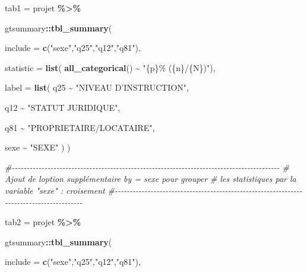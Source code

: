 \documentclass[
]{article}
\newenvironment{Shaded}{\begin{snugshade}}{\end{snugshade}}
\newcommand{\AttributeTok}[1]{\textcolor[rgb]{0.13,0.29,0.53}{#1}}
\newcommand{\CommentTok}[1]{\textcolor[rgb]{0.56,0.35,0.01}{\textit{#1}}}
\newcommand{\FunctionTok}[1]{\textcolor[rgb]{0.13,0.29,0.53}{\textbf{#1}}}
\newcommand{\NormalTok}[1]{#1}
\newcommand{\OtherTok}[1]{\textcolor[rgb]{0.56,0.35,0.01}{#1}}
\newcommand{\SpecialCharTok}[1]{\textcolor[rgb]{0.81,0.36,0.00}{\textbf{#1}}}
\newcommand{\StringTok}[1]{\textcolor[rgb]{0.31,0.60,0.02}{#1}}
\begin{document}
\begin{Shaded}
\begin{Highlighting}[]
\NormalTok{tab1 }\OtherTok{=}\NormalTok{ projet }\SpecialCharTok{\%\textgreater{}\%}
  
  
\NormalTok{  gtsummary}\SpecialCharTok{::}\FunctionTok{tbl\_summary}\NormalTok{(}
    
    \AttributeTok{include =} \FunctionTok{c}\NormalTok{(}\StringTok{"sexe"}\NormalTok{,}\StringTok{"q25"}\NormalTok{,}\StringTok{"q12"}\NormalTok{,}\StringTok{"q81"}\NormalTok{),}
    
    \AttributeTok{statistic =}  \FunctionTok{list}\NormalTok{( }\FunctionTok{all\_categorical}\NormalTok{() }\SpecialCharTok{\textasciitilde{}} \StringTok{"\{p\}\% (\{n\}/\{N\})"}\NormalTok{),}
    
    \AttributeTok{label =} \FunctionTok{list}\NormalTok{( q25 }\SpecialCharTok{\textasciitilde{}} \StringTok{"NIVEAU D’INSTRUCTION"}\NormalTok{,}
                  
\NormalTok{                  q12 }\SpecialCharTok{\textasciitilde{}} \StringTok{"STATUT JURIDIQUE"}\NormalTok{,}
                  
\NormalTok{                  q81 }\SpecialCharTok{\textasciitilde{}} \StringTok{"PROPRIETAIRE/LOCATAIRE"}\NormalTok{,}
                  
\NormalTok{                  sexe }\SpecialCharTok{\textasciitilde{}} \StringTok{"SEXE"} 
\NormalTok{                  )}
\NormalTok{  )}


\CommentTok{\#{-}{-}{-}{-}{-}{-}{-}{-}{-}{-}{-}{-}{-}{-}{-}{-}{-}{-}{-}{-}{-}{-}{-}{-}{-}{-}{-}{-}{-}{-}{-}{-}{-}{-}{-}{-}{-}{-}{-}{-}{-}{-}{-}{-}{-}{-}{-}{-}{-}{-}{-}{-}{-}{-}{-}{-}{-}{-}{-}{-}{-}{-}{-}{-}{-}{-}{-}{-}{-}{-}{-}{-}{-}{-}{-}{-}{-}{-}{-}{-}{-}{-}{-}{-}{-}{-}{-}{-}{-}{-}}
\CommentTok{\#   Ajout de l\textquotesingle{}option supplémentaire by = sexe pour grouper}
\CommentTok{\#       les statistiques par la variable "sexe" : croisement}
\CommentTok{\#{-}{-}{-}{-}{-}{-}{-}{-}{-}{-}{-}{-}{-}{-}{-}{-}{-}{-}{-}{-}{-}{-}{-}{-}{-}{-}{-}{-}{-}{-}{-}{-}{-}{-}{-}{-}{-}{-}{-}{-}{-}{-}{-}{-}{-}{-}{-}{-}{-}{-}{-}{-}{-}{-}{-}{-}{-}{-}{-}{-}{-}{-}{-}{-}{-}{-}{-}{-}{-}{-}{-}{-}{-}{-}{-}{-}{-}{-}{-}{-}{-}{-}{-}{-}{-}{-}{-}{-}{-}}



\NormalTok{tab2 }\OtherTok{=}\NormalTok{ projet }\SpecialCharTok{\%\textgreater{}\%}
  
  
\NormalTok{  gtsummary}\SpecialCharTok{::}\FunctionTok{tbl\_summary}\NormalTok{(}
    
    \AttributeTok{include =} \FunctionTok{c}\NormalTok{(}\StringTok{"sexe"}\NormalTok{,}\StringTok{"q25"}\NormalTok{,}\StringTok{"q12"}\NormalTok{,}\StringTok{"q81"}\NormalTok{),}
    

\end{Highlighting}
\end{Shaded}
\end{document}
